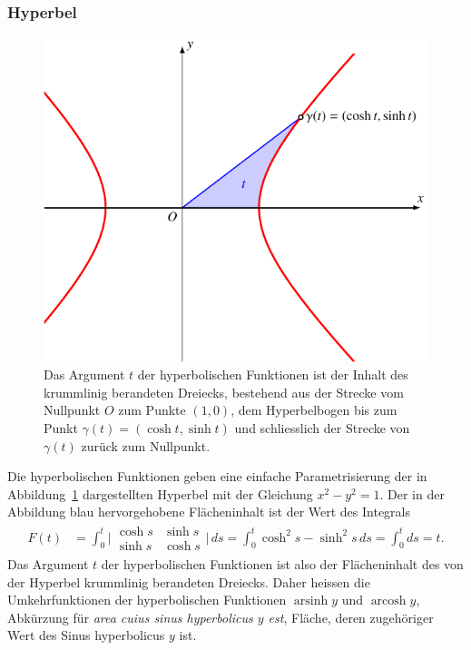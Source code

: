 \subsubsection{Hyperbel}
\begin{figure}
\centering
\includegraphics{chapters/030-geometrie/images/hyperbelflaeche.pdf}
\caption{Das Argument $t$ der hyperbolischen Funktionen ist der Inhalt
des krummlinig berandeten Dreiecks, bestehend aus der Strecke 
vom Nullpunkt $O$ zum Punkte $(1,0)$, dem Hyperbelbogen bis zum
Punkt $\gamma(t)=(\cosh t,\sinh t)$ und schliesslich der Strecke
von $\gamma(t)$ zurück zum Nullpunkt.
\label{buch:geometrie:fig:hyperbelflaeche}}
\end{figure}
Die hyperbolischen Funktionen geben eine einfache Parametrisierung
der in Abbildung~\ref{buch:geometrie:fig:hyperbelflaeche}
dargestellten Hyperbel mit der Gleichung
\(
x^2-y^2=1
\).
Der in der Abbildung blau hervorgehobene Flächeninhalt ist der Wert
des Integrals
\begin{align*}
F(t)
&=
\int_0^t
\biggl|
\begin{matrix}
\cosh s&\sinh s\\
\sinh s&\cosh s
\end{matrix}
\biggr|
\,ds
=
\int_0^t
\cosh^2s-\sinh^2s\,ds
=
\int_0^t ds = t.
\end{align*}
Das Argument $t$ der hyperbolischen Funktionen ist also der Flächeninhalt
des von der Hyperbel krummlinig berandeten Dreiecks.
Daher heissen die Umkehrfunktionen der hyperbolischen Funktionen
$\operatorname{arsinh}y$ und $\operatorname{arcosh}y$, Abkürzung
für {\em area cuius sinus hyperbolicus $y$ est}, Fläche, deren zugehöriger
Wert des Sinus hyperbolicus $y$ ist.

